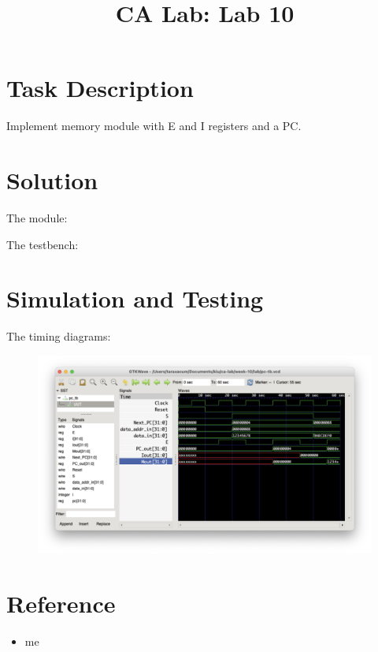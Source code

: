 \documentclass{../../../template}
\title{CA Lab: Lab 10}
\begin{document}
    \maketitle

    \section*{Task Description}

    Implement memory module with E and I registers and a PC.

    \section*{Solution}

    The module:

    

    The testbench:

    

    \section*{Simulation and Testing}

    The timing diagrams:

    \begin{figure}[H]
        \includegraphics[width=12cm]{diagram.png}
    \end{figure}

    \section*{Reference}

    \begin{itemize}
        \item me
    \end{itemize}
\end{document}
